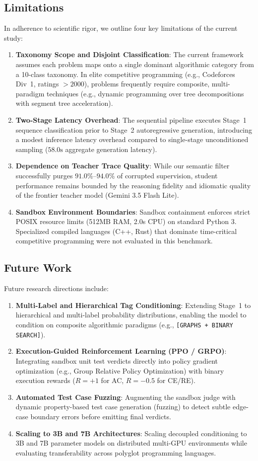 \documentclass{ieeeaccess}
\begin{document}
\subsection{Limitations}
\label{sec:limitations}
In adherence to scientific rigor, we outline four key limitations of the current study:
\begin{enumerate}
    \item \textbf{Taxonomy Scope and Disjoint Classification}: The current framework assumes each problem maps onto a single dominant algorithmic category from a 10-class taxonomy. In elite competitive programming (e.g., Codeforces Div~1, ratings $>2000$), problems frequently require composite, multi-paradigm techniques (e.g., dynamic programming over tree decompositions with segment tree acceleration).
    \item \textbf{Two-Stage Latency Overhead}: The sequential pipeline executes Stage~1 sequence classification prior to Stage~2 autoregressive generation, introducing a modest inference latency overhead compared to single-stage unconditioned sampling ($58.0\text{s}$ aggregate generation latency).
    \item \textbf{Dependence on Teacher Trace Quality}: While our semantic filter successfully purges $91.0\%\text{--}94.0\%$ of corrupted supervision, student performance remains bounded by the reasoning fidelity and idiomatic quality of the frontier teacher model (Gemini 3.5 Flash Lite).
    \item \textbf{Sandbox Environment Boundaries}: Sandbox containment enforces strict POSIX resource limits (512MB RAM, 2.0s CPU) on standard Python 3. Specialized compiled languages (C++, Rust) that dominate time-critical competitive programming were not evaluated in this benchmark.
\end{enumerate}

\subsection{Future Work}
Future research directions include:
\begin{enumerate}
    \item \textbf{Multi-Label and Hierarchical Tag Conditioning}: Extending Stage~1 to hierarchical and multi-label probability distributions, enabling the model to condition on composite algorithmic paradigms (e.g., \texttt{[GRAPHS + BINARY SEARCH]}).
    \item \textbf{Execution-Guided Reinforcement Learning (PPO / GRPO)}: Integrating sandbox unit test verdicts directly into policy gradient optimization (e.g., Group Relative Policy Optimization) with binary execution rewards ($R = +1$ for AC, $R = -0.5$ for CE/RE).
    \item \textbf{Automated Test Case Fuzzing}: Augmenting the sandbox judge with dynamic property-based test case generation (fuzzing) to detect subtle edge-case boundary errors before emitting final verdicts.
    \item \textbf{Scaling to 3B and 7B Architectures}: Scaling decoupled conditioning to 3B and 7B parameter models on distributed multi-GPU environments while evaluating transferability across polyglot programming languages.
\end{enumerate}
\end{document}
